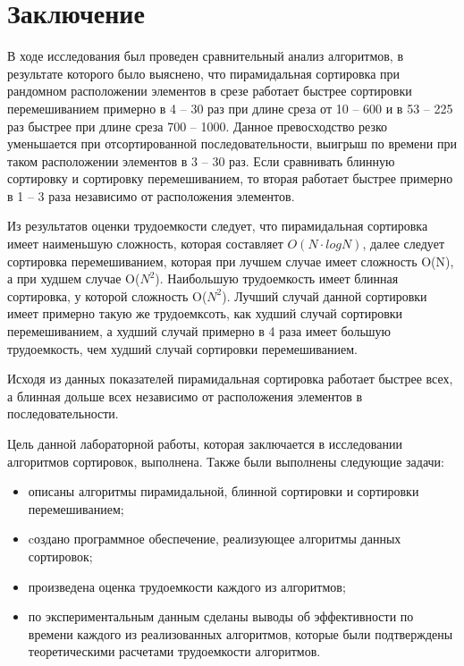 \chapter*{Заключение}

В ходе исследования был проведен сравнительный анализ алгоритмов, в результате
которого было выяснено, что пирамидальная сортировка при рандомном расположении элементов в срезе 
работает быстрее сортировки перемешиванием примерно в 4 -- 30 раз при длине среза от 10 -- 600 и в 53 -- 225 раз быстрее при длине среза 700 -- 1000.
Данное превосходство резко уменьшается при отсортированной последовательности, выигрыш по времени при таком расположении элементов
в 3 -- 30 раз.
Если сравнивать блинную сортировку и сортировку перемешиванием, то вторая работает быстрее 
примерно в 1 -- 3 раза независимо от расположения элементов. 

Из результатов оценки трудоемкости следует, что пирамидальная сортировка имеет наименьшую сложность, 
которая составляет $O(N \cdot logN)$, далее следует сортировка перемешиванием, которая при лучшем случае имеет 
сложность O(N), а при худшем случае O($N^2$). Наибольшую трудоемкость имеет блинная сортировка, у которой сложность O($N^2$).
Лучший случай данной сортировки имеет примерно такую же трудоемксоть, как худший случай сортировки перемешиванием, а худший случай 
примерно в 4 раза имеет большую трудоемкость, чем худший случай сортировки перемешиванием.

Исходя из данных показателей пирамидальная сортировка работает быстрее всех,
а блинная дольше всех независимо от расположения элементов в последовательности.

Цель данной лабораторной работы, которая заключается в исследовании алгоритмов сортировок, выполнена. Также были выполнены следующие задачи:

\begin{itemize}[left=\parindent]
    \item описаны алгоритмы пирамидальной, блинной сортировки и 
        сортировки перемешиванием;
    \item cоздано программное обеспечение, реализующее алгоритмы данных сортировок;
    \item произведена оценка трудоемкости каждого из алгоритмов;
    \item по экспериментальным данным сделаны выводы об эффективности по
        времени каждого из реализованных алгоритмов, которые были подтверждены
        теоретическими расчетами трудоемкости алгоритмов.
\end{itemize}
